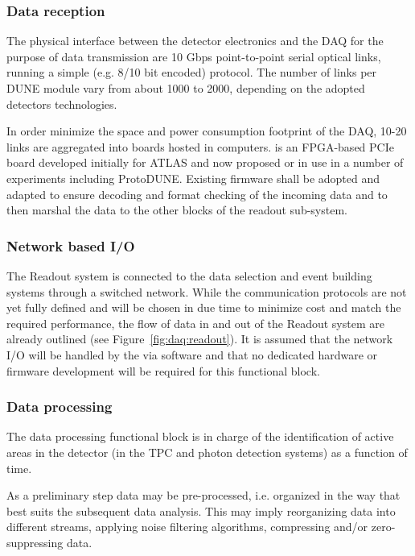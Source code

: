 \subsubsection{Data reception}

The physical interface between the detector electronics and the DAQ for the purpose of data transmission are 10 Gbps point-to-point serial optical links, running a simple (e.g. 8/10 bit encoded) protocol. 
The number of links per DUNE module vary from about 1000 to 2000, depending on the adopted detectors technologies.

In order minimize the space and power consumption footprint of the DAQ, 10-20 links are aggregated into  boards hosted in  computers. 
 is an FPGA-based PCIe board developed initially for ATLAS and now proposed or in use in a number of experiments including ProtoDUNE. 
Existing firmware shall be adopted and adapted to ensure decoding and format checking of the incoming data and to then marshal the data to the other blocks of the readout sub-system.

\subsubsection{Network based I/O}

The Readout system is connected to the data selection and event building systems through a  switched network.
While the communication protocols are not yet fully defined and will be chosen in due time to minimize cost and match the required performance, the flow of data in and out of the Readout system are already outlined (see Figure~\ref{fig:daq:readout}). 
It is assumed that the network I/O will be handled by the  via software and that no dedicated hardware or firmware development will be required for this functional block.

\subsubsection{Data processing}

The data processing functional block is in charge of the identification of active areas in the detector (in the TPC and photon detection systems) as a function of time.

As a preliminary step data may be pre-processed, i.e. organized in the way that best suits the subsequent data analysis. This may imply reorganizing data into different streams, applying noise filtering algorithms, compressing and/or zero-suppressing data.

